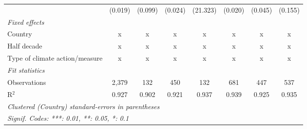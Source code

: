 \begin{table}[htbp]
\begin{tabular}{lccccccc}
                                                                                        & (0.019)       & (0.099)                   & (0.024)        & (21.323)         & (0.020)         & (0.045)         & (0.155)\\   
      \emph{Fixed effects}\\
      Country                                                                           & x             & x                         & x              & x                & x               & x               & x\\  
      Half decade                                                                       & x             & x                         & x              & x                & x               & x               & x\\  
      Type of climate action/measure                                                    & x             & x                         & x              & x                & x               & x               & x\\  
      \midrule \emph{Fit statistics}\\
      Observations                                                                      & 2,379         & 132                       & 450            & 132              & 681             & 447             & 537\\  
      R$^2$                                                                             & 0.927         & 0.902                     & 0.921          & 0.937            & 0.939           & 0.925           & 0.935\\  
      \midrule
      \multicolumn{8}{l}{\emph{Clustered (Country) standard-errors in parentheses}}\\
      \multicolumn{8}{l}{\emph{Signif. Codes: ***: 0.01, **: 0.05, *: 0.1}}\\
   \end{tabular}
\end{table}


